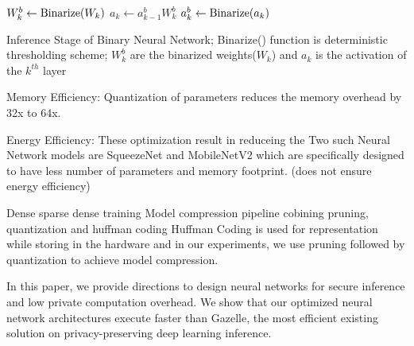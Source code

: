 \begin{algorithm}
\begin{algorithmic}
        \STATE $W_k^b \leftarrow {\rm Binarize}(W_k)$
        \STATE $a_k \leftarrow a_{k-1}^b W_k^b$
            \STATE $a_k^b \leftarrow {\rm Binarize}(a_k)$
        \ENDIF
    \ENDFOR

\end{algorithmic}
\caption{
Inference Stage of Binary Neural Network; Binarize() function is deterministic thresholding scheme; $W_k^b$ are the binarized weights($W_k$) and $a_k$ is the activation of the $k^{th}$ layer
}
\label{alg:train}
\end{algorithm}

Memory Efficiency: Quantization of parameters reduces the memory overhead by 32x to 64x.

Energy Efficiency: These optimization result in reduceing the
Two such Neural Network models are SqueezeNet \cite{DBLP:journals/corr/IandolaMAHDK16} and MobileNetV2 \cite{conf/cvpr/SandlerHZZC18} which are specifically designed to have less number of parameters and memory footprint. (does not ensure energy efficiency)

Dense sparse dense training \cite{DBLP:journals/corr/HanPNMTECTD16}
Model compression pipeline cobining pruning, quantization and huffman coding \cite{DBLP:journals/corr/HanMD15}
Huffman Coding is used for representation while storing in the hardware and in our experiments, we use pruning followed by quantization to achieve model compression.


In this paper, we provide directions to design neural networks for secure inference and low private computation overhead. We show that our optimized neural network architectures execute faster than Gazelle, the most efficient existing solution on privacy-preserving deep learning inference.
